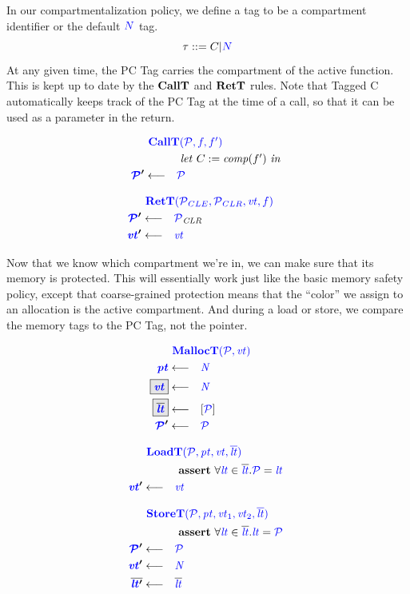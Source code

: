\documentclass[acmsmall,review,anonymous]{acmart}\settopmatter{printfolios=true,printccs=false,printacmref=false}
\begin{document}
In our compartmentalization policy, we define a tag to be a compartment identifier or
the default \({\color{blue} N}\) tag.
%
\[\tau ::= C | {\color{blue} N}\]
%
At any given time, the PC Tag carries the compartment of the active function.
This is kept up to date by the \(\mathbf{CallT}\) and \(\mathbf{RetT}\) rules. Note that
Tagged C automatically keeps track of the PC Tag at the time of a call, so that
it can be used as a parameter in the return.

\begin{minipage}[t]{.49\textwidth}
  \[\begin{aligned}
  \truledef{\callt}
  \letin{C := \mathit{comp}(f')}
  \settag{\PCT'}{\PCT}
  \end{aligned}\]
\end{minipage}
\begin{minipage}[t]{.49\textwidth}
  \[\begin{aligned}
  \truledef{\rett}
  \settag{\PCT'}{\PCT_{CLR}}
  \settag{\vt'}{\vt}
  \end{aligned}\]
\end{minipage}

Now that we know which compartment we're in, we can make sure that its memory is protected.
This will essentially work just like the basic memory safety policy, except that coarse-grained
protection means that the ``color'' we assign to an allocation is the active compartment.
And during a load or store, we compare the memory tags to the PC Tag, not the pointer.

\begin{minipage}[t]{0.25\textwidth}
\[\begin{aligned}
\truledef{\malloct}
\settag{\pt}{\N}
\settagopt{\vt}{\N}
\settagopt{\overline{\lt}}{\left[\PCT\right]}
\settag{\PCT'}{\PCT}
\end{aligned}\]
\end{minipage}
\begin{minipage}[t]{0.3\textwidth}
\[\begin{aligned}
\truledef{\loadt}
\assert{\forall \lt \in \overline{\lt} . \PCT = \lt}
\settag{\vt'}{\vt}
\end{aligned}\]
\end{minipage}
\begin{minipage}[t]{0.5\textwidth}
\[\begin{aligned}
\truledef{\storet}
\assert{\forall \lt \in \overline{\lt} . \lt = \PCT}
\settag{\PCT'}{\PCT}
\settag{\vt'}{\N}
\settag{\overline{\lt'}}{\overline{\lt}}
\end{aligned}\]
\end{minipage}
\end{document}
